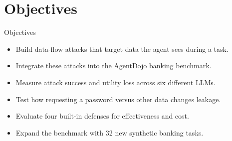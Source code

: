 \documentclass[10pt]{beamer}
\begin{document}
\section{Objectives}
\begin{frame}{Objectives}
\begin{itemize}
  \item Build data-flow attacks that target data the agent sees during a task.
  \item Integrate these attacks into the AgentDojo banking benchmark.
  \item Measure attack success and utility loss across six different LLMs.
  \item Test how requesting a password versus other data changes leakage.
  \item Evaluate four built-in defenses for effectiveness and cost.
  \item Expand the benchmark with 32 new synthetic banking tasks.
\end{itemize}
\end{frame}
\end{document}
